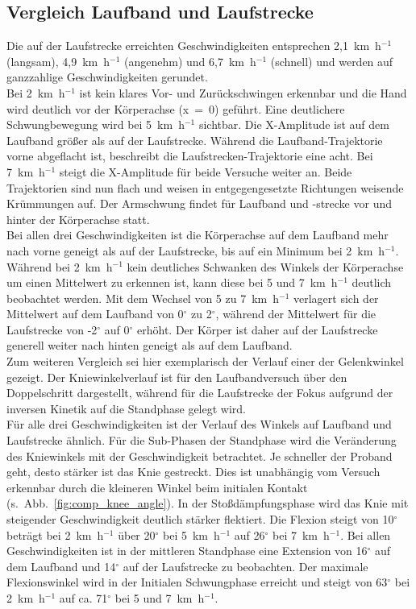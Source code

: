 \subsection{Vergleich Laufband und Laufstrecke}
Die auf der Laufstrecke erreichten Geschwindigkeiten entsprechen 2,1~km~h$^{-1}$ (langsam), 4,9~km~h$^{-1}$ (angenehm) und 6,7~km~h$^{-1}$ (schnell) und werden auf ganzzahlige Geschwindigkeiten gerundet.\\
Bei 2~km~h$^{-1}$ ist kein klares Vor- und Zurückschwingen erkennbar und die Hand wird deutlich vor der Körperachse (x~=~0) geführt. Eine deutlichere Schwungbewegung wird bei 5~km~h$^{-1}$ sichtbar. Die X-Amplitude ist auf dem Laufband größer als auf der Laufstrecke. Während die Laufband-Trajektorie vorne abgeflacht ist, beschreibt die Laufstrecken-Trajektorie eine acht. Bei 7~km~h$^{-1}$ steigt die X-Amplitude für beide Versuche weiter an. Beide Trajektorien sind nun flach und weisen in entgegengesetzte Richtungen weisende Krümmungen auf. Der Armschwung findet für Laufband und -strecke vor und hinter der Körperachse statt.\\
Bei allen drei Geschwindigkeiten ist die Körperachse auf dem Laufband mehr nach vorne geneigt als auf der Laufstrecke, bis auf ein Minimum bei 2~km~h$^{-1}$. Während bei 2~km~h$^{-1}$ kein deutliches Schwanken des Winkels der Körperachse um einen Mittelwert zu erkennen ist, kann diese bei 5 und 7~km~h$^{-1}$ deutlich beobachtet werden. Mit dem Wechsel von 5 zu 7~km~h$^{-1}$ verlagert sich der Mittelwert auf dem Laufband von 0$^{\circ}$ zu 2$^{\circ}$, während der Mittelwert für die Laufstrecke von -2$^{\circ}$ auf 0$^{\circ}$ erhöht. Der Körper ist daher auf der Laufstrecke generell weiter nach hinten geneigt als auf dem Laufband.\\
Zum weiteren Vergleich sei hier exemplarisch der Verlauf einer der Gelenkwinkel gezeigt. Der Kniewinkelverlauf ist für den Laufbandversuch über den Doppelschritt dargestellt, während für die Laufstrecke der Fokus aufgrund der inversen Kinetik auf die Standphase gelegt wird.\\
Für alle drei Geschwindigkeiten ist der Verlauf des Winkels auf Laufband und Laufstrecke ähnlich. Für die Sub-Phasen der Standphase wird die Veränderung des Kniewinkels mit der Geschwindigkeit betrachtet. Je schneller der Proband geht, desto stärker ist das Knie gestreckt. Dies ist unabhängig vom Versuch erkennbar durch die kleineren Winkel beim initialen Kontakt (s.~Abb.~\ref{fig:comp_knee_angle}). In der Stoßdämpfungsphase wird das Knie mit steigender Geschwindigkeit deutlich stärker flektiert. Die Flexion steigt von 10$^{\circ}$ beträgt bei 2~km~h$^{-1}$ über 20$^{\circ}$ bei 5~km~h$^{-1}$ auf 26$^{\circ}$ bei 7~km~h$^{-1}$. Bei allen Geschwindigkeiten ist in der mittleren Standphase eine Extension von 16$^{\circ}$ auf dem Laufband und 14$^{\circ}$ auf der Laufstrecke zu beobachten. Der maximale Flexionswinkel wird in der Initialen Schwungphase erreicht und steigt von 63$^{\circ}$ bei 2~km~h$^{-1}$ auf ca. 71$^{\circ}$ bei 5 und 7~km~h$^{-1}$.\\ 

